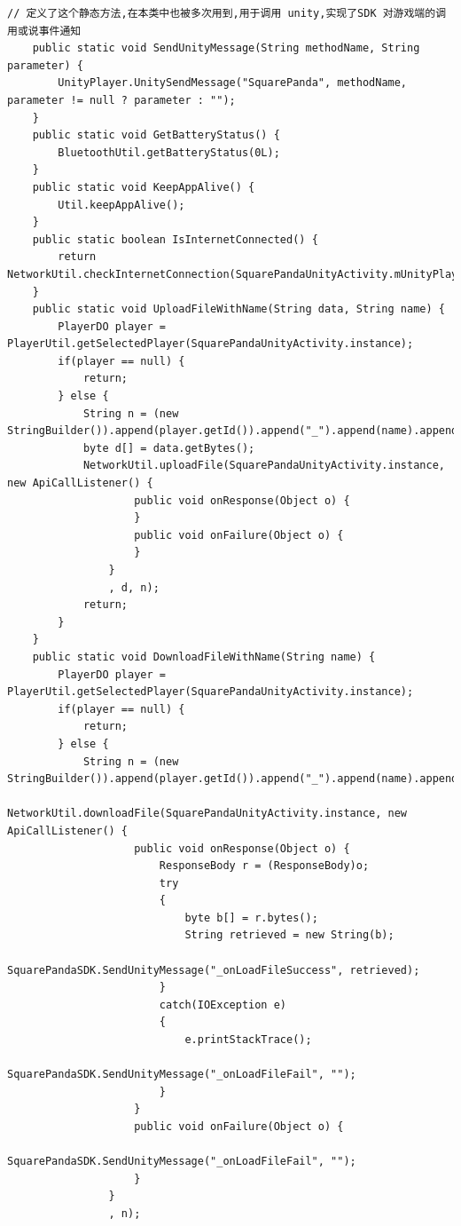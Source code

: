 \documentclass[9pt, b5paper]{article}
\begin{document}
\begin{verbatim}
// 定义了这个静态方法,在本类中也被多次用到,用于调用 unity,实现了SDK 对游戏端的调用或说事件通知
    public static void SendUnityMessage(String methodName, String parameter) {
        UnityPlayer.UnitySendMessage("SquarePanda", methodName, parameter != null ? parameter : "");
    }
    public static void GetBatteryStatus() {
        BluetoothUtil.getBatteryStatus(0L);
    }
    public static void KeepAppAlive() {
        Util.keepAppAlive();
    }
    public static boolean IsInternetConnected() {
        return NetworkUtil.checkInternetConnection(SquarePandaUnityActivity.mUnityPlayer.getContext());
    }
    public static void UploadFileWithName(String data, String name) {
        PlayerDO player = PlayerUtil.getSelectedPlayer(SquarePandaUnityActivity.instance);
        if(player == null) {
            return;
        } else {
            String n = (new StringBuilder()).append(player.getId()).append("_").append(name).append(".json").toString();
            byte d[] = data.getBytes();
            NetworkUtil.uploadFile(SquarePandaUnityActivity.instance, new ApiCallListener() {
                    public void onResponse(Object o) {
                    }
                    public void onFailure(Object o) {
                    }
                }
                , d, n);
            return;
        }
    }
    public static void DownloadFileWithName(String name) {
        PlayerDO player = PlayerUtil.getSelectedPlayer(SquarePandaUnityActivity.instance);
        if(player == null) {
            return;
        } else {
            String n = (new StringBuilder()).append(player.getId()).append("_").append(name).append(".json").toString();
            NetworkUtil.downloadFile(SquarePandaUnityActivity.instance, new ApiCallListener() {
                    public void onResponse(Object o) {
                        ResponseBody r = (ResponseBody)o;
                        try
                        {
                            byte b[] = r.bytes();
                            String retrieved = new String(b);
                            SquarePandaSDK.SendUnityMessage("_onLoadFileSuccess", retrieved);
                        }
                        catch(IOException e)
                        {
                            e.printStackTrace();
                            SquarePandaSDK.SendUnityMessage("_onLoadFileFail", "");
                        }
                    }
                    public void onFailure(Object o) {
                        SquarePandaSDK.SendUnityMessage("_onLoadFileFail", "");
                    }
                }
                , n);

\end{verbatim}
\end{document}
